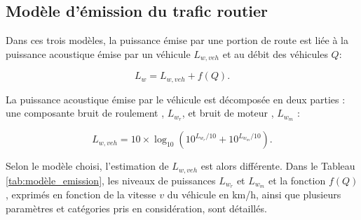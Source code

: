 \subsection{Modèle d'émission du trafic routier}\label{part:modele_emission}

Dans ces trois modèles, la puissance émise par une portion de route est liée à la puissance acoustique émise par un véhicule $L_{w,veh}$ et au débit des véhicules $Q$:

\begin{equation}
L_w = L_{w,veh} + f(Q).
\end{equation}

La puissance acoustique émise par le véhicule est décomposée en deux parties : une composante \og bruit de roulement \fg{}, $L_{w_r}$, et \og bruit de moteur \fg{}, $L_{w_m}$ :

\begin{equation}
L_{w,veh} = 10\times \log_{10} \left(10^{L_{w_r}/10}+10^{L_{w_m}/10}\right).
\end{equation}

Selon le modèle choisi, l'estimation de $L_{w,veh}$ est alors différente. Dans le Tableau \ref{tab:modèle_emission}, les niveaux de puissances $L_{w_r}$ et $L_{w_m}$ et la fonction $f(Q)$, exprimés en fonction de la vitesse $v$ du véhicule en km/h, ainsi que plusieurs paramètres et catégories pris en considération, sont détaillés.

